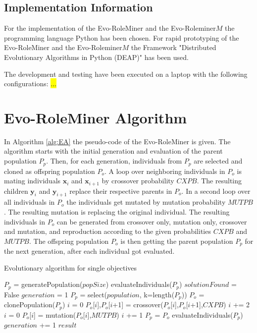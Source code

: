 \newpage
\subsection{Implementation Information}
	For the implementation of the Evo-RoleMiner and the Evo-Roleminer$M$ the programming language Python has been chosen. For rapid prototyping of the Evo-RoleMiner and the Evo-Roleminer$M$ the Framework "Distributed Evolutionary Algorithms in Python (DEAP)"\cite{DeRainville:2012} has been used.
	
	The development and testing have been executed on a laptop with the following configurations: \hl{...}
	
\section{Evo-RoleMiner Algorithm}
	In Algorithm \ref{alg:EA} the pseudo-code of the Evo-RoleMiner is given. The algorithm starts with the initial generation and evaluation of the parent population $P_p$. Then, for each generation, individuals from $P_p$ are selected and cloned as offspring population $P_o$. A loop over neighboring individuals in $P_o$ is mating individuals $\mathbf{x}_i$ and $\mathbf{x}_{i+1}$ by crossover probability $CXPB$. The resulting children $\mathbf{y}_i$ and $\mathbf{y}_{i+1}$ replace their respective parents in $P_o$. In a second loop over all individuals in $P_o$ the individuals get mutated by mutation probability $MUTPB$. The resulting mutation is replacing the original individual. The resulting individuals in $P_o$ can be generated from crossover only, mutation only, crossover and mutation, and reproduction according to the given probabilities $CXPB$ and $MUTPB$. The offspring population $P_o$ is then getting the parent population $P_p$ for the next generation, after each individual got evaluated.
	\begin{algorithm}[H]
	   	\caption{Evolutionary algorithm for single objectives}
	   	\label{alg:EA}
	   	\begin{algorithmic}[1]
	   		\State $P_p$ = generatePopulation($popSize$)
	   		\State evaluateIndividuals($P_p$)
	   		\State $solutionFound$ = False
	   		\State $generation$ = 1
	   		\State $P_p$ = select($population$, k=length($P_p$))
	   		\State $P_o$ = clonePopulation($P_p$)
	   		\State $i$ = 0
	   		\State $P_o$[$i$],$P_o$[$i$+1] = crossover($P_o$[$i$],$P_o$[$i$+1],$CXPB$)
	   		\State $i$ += 2
	   		\EndWhile
	   		\State $i$ = 0
	   		\State $P_o$[$i$] = mutation($P_o$[$i$],$MUTPB$)
	   		\State $i$ += 1
	   		\EndWhile
	   		\State $P_p$ = $P_o$
	   		\State evaluateIndividuals($P_p$)
	   		\State $generation$ += 1
	   		\EndWhile
	   		\State \Return $result$
	   		\EndProcedure
	   	\end{algorithmic}
	\end{algorithm}

